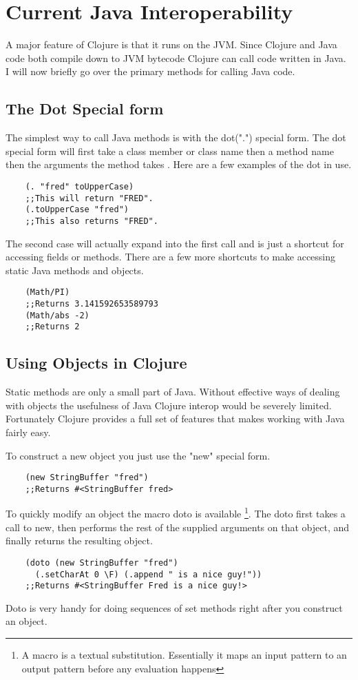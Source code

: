 \documentclass[12pt]{article}
\begin{document}
\section{Current Java Interoperability}\label{sec:bg}
	A major feature of Clojure is that it runs on the JVM. Since Clojure and Java code both compile down to JVM bytecode Clojure can call code written in Java. I will now briefly go over the primary methods for calling Java code.
	
	\subsection{The Dot Special form}
	The simplest way to call Java methods is with the dot(".") special form. The dot special form will first take a class member or class name then a method name then the arguments the method takes \cite{cloj:interop}. Here are a few examples of the dot in use.
	\begin{verbatim}
	(. "fred" toUpperCase)
	;;This will return "FRED".
	(.toUpperCase "fred")
	;;This also returns "FRED".
	\end{verbatim}
	The second case will actually expand into the first call and is just a shortcut for accessing fields or methods. There are a few more shortcuts to make accessing static Java methods and objects.
	
	\begin{verbatim}
	(Math/PI)
	;;Returns 3.141592653589793
	(Math/abs -2)
	;;Returns 2
	\end{verbatim}
	
	\subsection{Using Objects in Clojure}
	Static methods are only a small part of Java. Without effective ways of dealing with objects the usefulness of Java Clojure interop would be severely limited. Fortunately Clojure provides a full set of features that makes working with Java fairly easy.
	
	To construct a new object you just use the "new" special form.
	\begin{verbatim}
	(new StringBuffer "fred")
	;;Returns #<StringBuffer fred>
	\end{verbatim} 
	
	To quickly modify an object the macro doto is available \footnote[1]{A macro is a textual substitution. Essentially it maps an input pattern to an output pattern before any evaluation happens}. The doto first takes a call to new, then performs the rest of the supplied arguments on that object, and finally returns the resulting object.
	\begin{verbatim}
	(doto (new StringBuffer "fred") 
	  (.setCharAt 0 \F) (.append " is a nice guy!"))
	;;Returns #<StringBuffer Fred is a nice guy!>
	\end{verbatim}
	Doto is very handy for doing sequences of set methods right after you construct an object.
	
\end{document}

